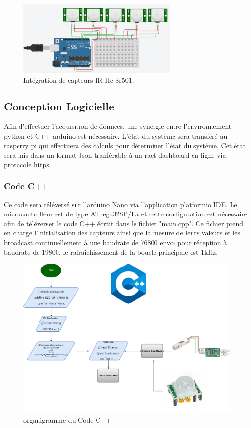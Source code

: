 \documentclass[journal]{IEEEtran}
\begin{document}
\begin{figure}[htbp]
    \centerline{\includegraphics{hardware2.png}}
    \caption{Intégration de capteurs IR Hc-Sr501.\cite{b5}}
    \label{fig2}
\end{figure} 


\subsection{Conception Logicielle}
Afin d'effectuer l'acquisition de données, une synergie entre l'environnement python et C++ arduino est nécessaire. L'état du système sera transféré au rasperry pi qui effectuera
des calculs pour déterminer l'état du système. Cet état sera mis dans un format Json tranférable à un ract dashboard en ligne via protocole https. 

\subsubsection{Code C++}
Ce code sera téléversé sur l'arduino Nano  via l'application platformio IDE. Le microcontrolleur est de type ATnega328P/Pa et cette configuration est nécessaire afin de 
téléverser le code C++ écrtit dans le fichier "main.cpp". Ce fichier prend en charge l'initialisation des capteurs ainsi que la mesure de leurs valeurs et les broadcast continuellement
à une baudrate de  76800 envoi pour réception à baudrate de 19800. le rafraichissement de la boucle principale est 1kHz. 

\begin{figure}[htbp]
    \centerline{\includegraphics[scale = 0.2]{Trottoir_Flowchart_arduino.drawio.png}}
    \caption{organigramme du Code C++}
    \label{fig3}
\end{figure} 
\end{document}
